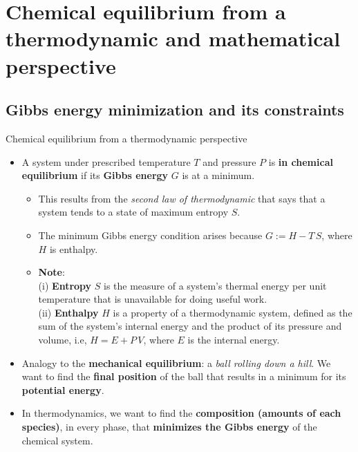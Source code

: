 
\section{Chemical equilibrium from a thermodynamic and mathematical perspective}

\subsection{Gibbs energy minimization and its constraints}
%
\begin{frame}{Chemical equilibrium from a thermodynamic perspective}
\begin{itemize}
\item A system under prescribed temperature $T$ and pressure $P$ is \textbf{in
chemical equilibrium} if its \textbf{Gibbs energy} $G$ is at a minimum. 
\begin{itemize}
\item This results from the \emph{second law of thermodynamic} that says
that a system tends to a state of maximum entropy $S$. 
\item The minimum Gibbs energy condition arises because $G := H - T\,S$, where
$H$ is enthalpy. 
\item \textbf{Note}: \\
\quad (i) \; \alert{\textbf{Entropy}} $S$ is the measure of a system's thermal energy per unit temperature that is unavailable for doing useful work. \\ 
\quad (ii)\; \alert{\textbf{Enthalpy}} $H$ is a property of a thermodynamic system, defined as the sum of the system's internal energy and the product of its pressure and volume, i.e, $H = E + P\, V$, where $E$ is the internal energy.
\end{itemize}
\pause
\item Analogy to the \textbf{mechanical equilibrium}: a \emph{ball rolling down a hill}. 
We want to find the \textbf{final position} of the ball that results in a minimum for its 
\textbf{potential energy}.
\pause
\item In thermodynamics, we want to find the \textbf{composition (amounts of each species)}, in every phase, that \textbf{minimizes the Gibbs energy} of the chemical system.
\end{itemize}
\end{frame}
